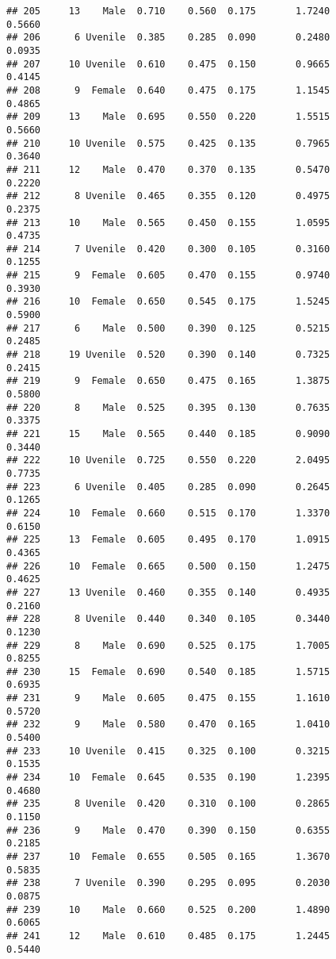 \documentclass[
]{article}
\begin{document}
\begin{verbatim}
## 205     13    Male  0.710    0.560  0.175       1.7240         0.5660
## 206      6 Uvenile  0.385    0.285  0.090       0.2480         0.0935
## 207     10 Uvenile  0.610    0.475  0.150       0.9665         0.4145
## 208      9  Female  0.640    0.475  0.175       1.1545         0.4865
## 209     13    Male  0.695    0.550  0.220       1.5515         0.5660
## 210     10 Uvenile  0.575    0.425  0.135       0.7965         0.3640
## 211     12    Male  0.470    0.370  0.135       0.5470         0.2220
## 212      8 Uvenile  0.465    0.355  0.120       0.4975         0.2375
## 213     10    Male  0.565    0.450  0.155       1.0595         0.4735
## 214      7 Uvenile  0.420    0.300  0.105       0.3160         0.1255
## 215      9  Female  0.605    0.470  0.155       0.9740         0.3930
## 216     10  Female  0.650    0.545  0.175       1.5245         0.5900
## 217      6    Male  0.500    0.390  0.125       0.5215         0.2485
## 218     19 Uvenile  0.520    0.390  0.140       0.7325         0.2415
## 219      9  Female  0.650    0.475  0.165       1.3875         0.5800
## 220      8    Male  0.525    0.395  0.130       0.7635         0.3375
## 221     15    Male  0.565    0.440  0.185       0.9090         0.3440
## 222     10 Uvenile  0.725    0.550  0.220       2.0495         0.7735
## 223      6 Uvenile  0.405    0.285  0.090       0.2645         0.1265
## 224     10  Female  0.660    0.515  0.170       1.3370         0.6150
## 225     13  Female  0.605    0.495  0.170       1.0915         0.4365
## 226     10  Female  0.665    0.500  0.150       1.2475         0.4625
## 227     13 Uvenile  0.460    0.355  0.140       0.4935         0.2160
## 228      8 Uvenile  0.440    0.340  0.105       0.3440         0.1230
## 229      8    Male  0.690    0.525  0.175       1.7005         0.8255
## 230     15  Female  0.690    0.540  0.185       1.5715         0.6935
## 231      9    Male  0.605    0.475  0.155       1.1610         0.5720
## 232      9    Male  0.580    0.470  0.165       1.0410         0.5400
## 233     10 Uvenile  0.415    0.325  0.100       0.3215         0.1535
## 234     10  Female  0.645    0.535  0.190       1.2395         0.4680
## 235      8 Uvenile  0.420    0.310  0.100       0.2865         0.1150
## 236      9    Male  0.470    0.390  0.150       0.6355         0.2185
## 237     10  Female  0.655    0.505  0.165       1.3670         0.5835
## 238      7 Uvenile  0.390    0.295  0.095       0.2030         0.0875
## 239     10    Male  0.660    0.525  0.200       1.4890         0.6065
## 241     12    Male  0.610    0.485  0.175       1.2445         0.5440

\end{verbatim}
\end{document}
